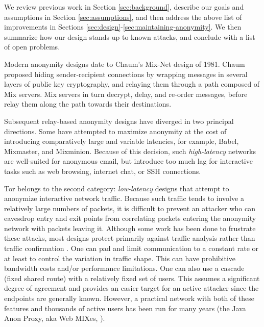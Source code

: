 \documentclass[times,10pt,twocolumn]{article}
\begin{document}
We review previous work in Section \ref{sec:background}, describe
our goals and assumptions in Section \ref{sec:assumptions},
and then address the above list of improvements in Sections
\ref{sec:design}-\ref{sec:maintaining-anonymity}. We then summarize
how our design stands up to known attacks, and conclude with a list of
open problems.


\label{sec:background}

\label{sec:related-work}
Modern anonymity designs date to Chaum's Mix-Net\cite{chaum-mix} design of
1981.  Chaum proposed hiding sender-recipient connections by wrapping
messages in several layers of public key cryptography, and relaying them
through a path composed of Mix servers.  Mix servers in turn decrypt, delay,
and re-order messages, before relay them along the path towards their
destinations.

Subsequent relay-based anonymity designs have diverged in two
principal directions.  Some have attempted to maximize anonymity at
the cost of introducing comparatively large and variable latencies,
for example, Babel\cite{babel}, Mixmaster\cite{mixmaster-spec}, and
Mixminion\cite{minion-design}.  Because of this
decision, such \emph{high-latency} networks are well-suited for anonymous
email, but introduce too much lag for interactive tasks such as web browsing,
internet chat, or SSH connections.

Tor belongs to the second category: \emph{low-latency} designs that
attempt to anonymize interactive network traffic.  Because such
traffic tends to involve a relatively large numbers of packets, it is
difficult to prevent an attacker who can eavesdrop entry and exit
points from correlating packets entering the anonymity network with
packets leaving it. Although some work has been done to frustrate
these attacks, most designs protect primarily against traffic analysis
rather than traffic confirmation \cite{or-jsac98}.  One can pad and
limit communication to a constant rate or at least to control the
variation in traffic shape. This can have prohibitive bandwidth costs
and/or performance limitations. One can also use a cascade (fixed
shared route) with a relatively fixed set of users. This assumes a
significant degree of agreement and provides an easier target for an active
attacker since the endpoints are generally known. However, a practical
network with both of these features and thousands of active users has
been run for many years (the Java Anon Proxy, aka Web MIXes,
\cite{web-mix}).
\end{document}

